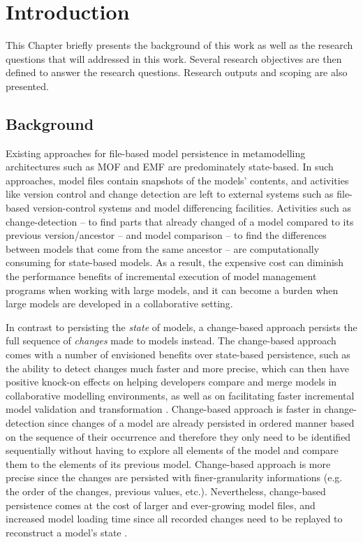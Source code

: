 \documentclass[12pt, a4paper]{report} \usepackage[titletoc]{appendix}
\begin{document}
\tableofcontents
{}

\listoffigures
\newpage
 
\listoftables
\newpage

\lstlistoflistings
\newpage

\chapter{Introduction}
\label{ch:introduction}
This Chapter briefly presents the background of this work as well as the research questions that will addressed in this work. Several research objectives are then defined to answer the research questions. Research outputs and scoping are also presented. 

\section{Background}
\label{sec:background}
Existing approaches for file-based model persistence in metamodelling architectures such as MOF and EMF are predominately state-based. In such approaches, model files contain snapshots of the models' contents, and activities like version control and change detection are left to external systems such as file-based version-control systems and model differencing facilities. Activities such as change-detection -- to find parts that already changed of a model compared to its previous version/ancestor -- and model comparison -- to find the differences between models that come from the same ancestor -- are computationally consuming for state-based models. As a result,  the expensive cost can diminish the performance benefits of incremental execution of model management programs when working with large models, and it can become a burden when large models are developed in a collaborative setting.

In contrast to persisting the \emph{state} of models, a change-based approach persists the full sequence of \emph{changes} made to models instead. The change-based approach comes with a number of envisioned benefits over state-based persistence, such as the ability to detect changes much faster and more precise, which can then have positive knock-on effects on helping developers compare and merge models in collaborative modelling environments, as well as on facilitating faster incremental model validation and transformation \cite{rath2012derived,ogunyomi2015property}. Change-based approach is faster in change-detection since changes of a model are already persisted in ordered manner based on the sequence of their occurrence and therefore they only need to be identified sequentially without having to explore all elements of the model and compare them to the elements of its previous model. Change-based approach is more precise since the changes are persisted with finer-granularity informations (e.g. the order of the changes, previous values, etc.). Nevertheless, change-based persistence comes at the cost of larger and ever-growing model files, and increased model loading time since all recorded changes need to be replayed to reconstruct a model's state \cite{yohannis2017turning}.
\end{document}
